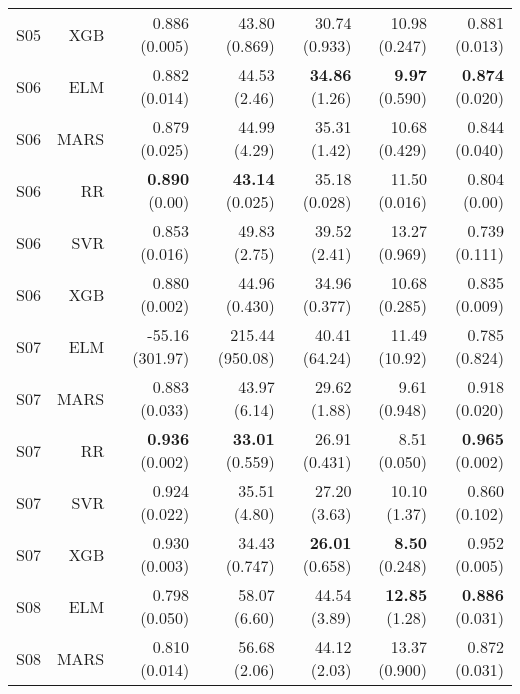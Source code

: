 \begin{table}
\begin{tabular}{rrrrrrr}
    S05 &       XGB &                       0.886 (0.005) &             43.80 (0.869) &           30.74 (0.933) &           10.98 (0.247) &         0.881 (0.013) \\
    S06 &       ELM &                       0.882 (0.014) &              44.53 (2.46) &     { \bf 34.86} (1.26) &     { \bf 9.97} (0.590) &  { \bf 0.874} (0.020) \\
    S06 &      MARS &                       0.879 (0.025) &              44.99 (4.29) &            35.31 (1.42) &           10.68 (0.429) &         0.844 (0.040) \\
    S06 &        RR &                 { \bf 0.890} (0.00) &      { \bf 43.14} (0.025) &           35.18 (0.028) &           11.50 (0.016) &          0.804 (0.00) \\
    S06 &       SVR &                       0.853 (0.016) &              49.83 (2.75) &            39.52 (2.41) &           13.27 (0.969) &         0.739 (0.111) \\
    S06 &       XGB &                       0.880 (0.002) &             44.96 (0.430) &           34.96 (0.377) &           10.68 (0.285) &         0.835 (0.009) \\
    S07 &       ELM &                     -55.16 (301.97) &           215.44 (950.08) &           40.41 (64.24) &           11.49 (10.92) &         0.785 (0.824) \\
    S07 &      MARS &                       0.883 (0.033) &              43.97 (6.14) &            29.62 (1.88) &            9.61 (0.948) &         0.918 (0.020) \\
    S07 &        RR &                { \bf 0.936} (0.002) &      { \bf 33.01} (0.559) &           26.91 (0.431) &            8.51 (0.050) &  { \bf 0.965} (0.002) \\
    S07 &       SVR &                       0.924 (0.022) &              35.51 (4.80) &            27.20 (3.63) &            10.10 (1.37) &         0.860 (0.102) \\
    S07 &       XGB &                       0.930 (0.003) &             34.43 (0.747) &    { \bf 26.01} (0.658) &     { \bf 8.50} (0.248) &         0.952 (0.005) \\
    S08 &       ELM &                       0.798 (0.050) &              58.07 (6.60) &            44.54 (3.89) &     { \bf 12.85} (1.28) &  { \bf 0.886} (0.031) \\
    S08 &      MARS &                       0.810 (0.014) &              56.68 (2.06) &            44.12 (2.03) &           13.37 (0.900) &         0.872 (0.031) \\

\end{tabular}
\end{table}
